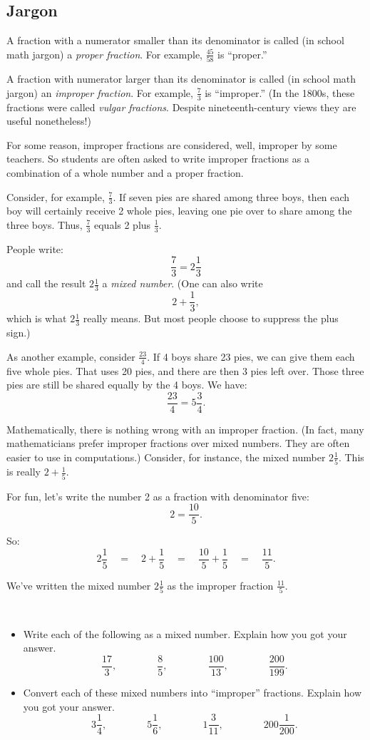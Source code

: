 \subsection{Jargon}
A fraction with a numerator smaller than its denominator is called (in school math jargon) a \emph{proper
fraction}. For example, $\frac {45}{58}$ is ``proper.''

A fraction with numerator larger than its denominator is called (in school math jargon) an \emph{improper
fraction}. 
For example, $\frac 7 3$ 
is  ``improper.'' (In the 1800s, these fractions were
called \emph{vulgar fractions}. Despite nineteenth-century views they are useful
nonetheless!)

For some reason, improper fractions are considered,
well, improper by some teachers.  So students are often asked to write improper fractions
as a combination of a whole number and a proper fraction.

Consider, for example,
$\frac 7 3$.
If seven pies are shared among three boys, then each boy
will certainly receive 2 whole pies, leaving one pie over to share among the three
boys. Thus, 
$\frac 7 3 $
equals 2 plus $\frac 1 3$.

People write:
\[
\frac 7 3 = 2\frac 1 3
\]
and call the result $2 \frac 1 3$
a \emph{mixed number}. (One can also write
\[
2 + \frac 1 3,
\]
which is what $2\frac 1 3$
really means.  But most people choose to suppress the plus sign.)

As another example, consider $\frac{23}4$.
If 4 boys share 23 pies, we can give them each five whole pies.  That uses 20 pies, and there
are then  3 pies left over.  Those three pies are still be shared equally by the 4 boys. We have:
\[
\frac{23}4 = 5\frac 3 4.
\]


Mathematically, there is nothing wrong with an improper fraction.  (In fact, many
mathematicians prefer improper fractions over mixed numbers.  They are often easier to use in computations.)
Consider, for instance, the mixed number $2\frac 1 5$.  This is really $2 + \frac 1 5$.

For fun, let's write the number 2 as a fraction with denominator five:
\[
2 = \frac{10} 5.
\]

So:
\[
2\frac 1 5 
\quad=\quad 2 + \frac 1 5 
\quad=\quad
 \frac{10} 5 + \frac{1} 5 
 \quad=\quad
  \frac{11}5.
\]

We've written the mixed number $2\frac 1 5$
as the improper fraction $\frac{11}5$.


\begin{thinkpair*}\ 
\begin{itemize}
\item
Write each of the following as a mixed number. Explain how you got your answer.
\[
\frac{17}3,
\qquad\qquad
\frac 8 5,
\qquad\qquad
\frac{100}{13},
\qquad\qquad
\frac{200}{199}.
\]

\item
Convert each of these mixed numbers  into ``improper'' fractions.  Explain how you got your answer.
\[
3\frac 1 4 ,
\qquad\qquad
5 \frac 1 6,
\qquad\qquad
1 \frac 3{11},
\qquad\qquad
200 \frac 1{200}.
\]
\end{itemize}

\end{thinkpair*}


